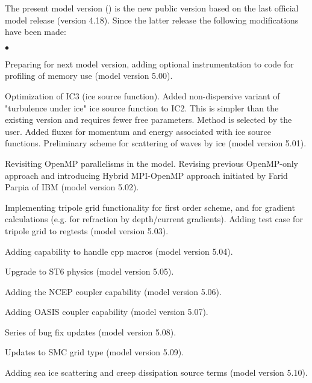 \vspace{\baselineskip} 
\noindent 
The present model version (\WWver) is the new public version based on the
last official model release (version 4.18). Since the latter release the
following modifications have been made:

\begin{list}{$\bullet$}{\rightmargin 5mm \parsep 0mm \itemsep 0mm}

\item Preparing for next model version, adding optional instrumentation to code
      for profiling of memory use (model version 5.00). 

\item Optimization of IC3 (ice source function). Added non-dispersive variant of "turbulence under ice" ice source function to IC2. This is simpler than the existing version and requires fewer free parameters. Method is selected by the user. Added fluxes for momentum and energy associated with ice source functions. Preliminary scheme for scattering of waves by ice (model version 5.01).

\item Revisiting OpenMP parallelisms in the model. Revising previous
      OpenMP-only approach and introducing Hybrid MPI-OpenMP approach
      initiated by Farid Parpia of IBM (model version 5.02).

\item Implementing tripole grid functionality for first order scheme, and for gradient calculations (e.g. for refraction by depth/current gradients). Adding test case for tripole grid to regtests (model version 5.03).

\item Adding capability to handle cpp macros (model version 5.04).

\item Upgrade to ST6 physics (model version 5.05).

\item Adding the NCEP coupler capability (model version 5.06).

\item Adding OASIS coupler capability (model version 5.07).

\item Series of bug fix updates (model version 5.08).

\item Updates to SMC grid type (model version 5.09).

\item Adding sea ice scattering and creep dissipation source terms (model version 5.10).


\end{list}
